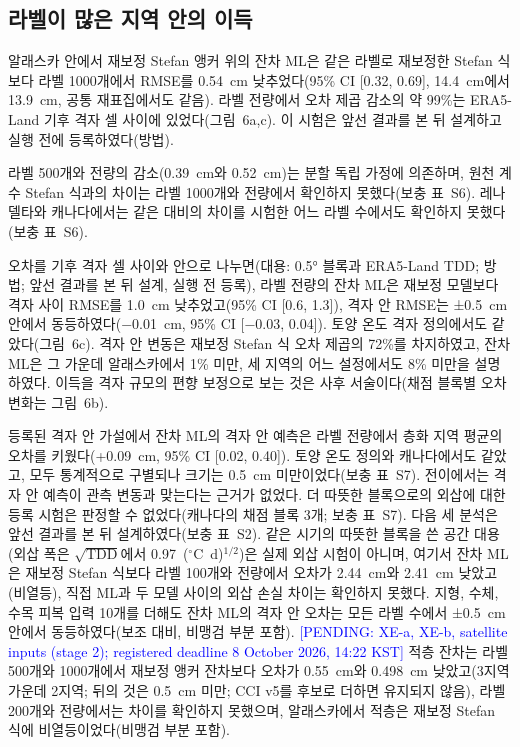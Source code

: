 
\subsection{라벨이 많은 지역 안의 이득}
\label{sec:results-label-rich}

알래스카 안에서 재보정 Stefan 앵커 위의 잔차 ML은 같은 라벨로 재보정한 Stefan 식보다 라벨 1000개에서 RMSE를 0.54~cm 낮추었다(95\% CI [0.32, 0.69], 14.4~cm에서 13.9~cm, 공통 재표집에서도 같음). 라벨 전량에서 오차 제곱 감소의 약 99\%는 ERA5-Land 기후 격자 셀 사이에 있었다\cite{munozsabater2021_era5_land}(그림~6a,c).
이 시험은 앞선 결과를 본 뒤 설계하고 실행 전에 등록하였다(방법).

라벨 500개와 전량의 감소(0.39~cm와 0.52~cm)는 분할 독립 가정에 의존하며, 원천 계수 Stefan 식과의 차이는 라벨 1000개와 전량에서 확인하지 못했다(보충 표~S6).
레나델타와 캐나다에서는 같은 대비의 차이를 시험한 어느 라벨 수에서도 확인하지 못했다(보충 표~S6).

오차를 기후 격자 셀 사이와 안으로 나누면(대용: 0.5° 블록과 ERA5-Land TDD; 방법; 앞선 결과를 본 뒤 설계, 실행 전 등록), 라벨 전량의 잔차 ML은 재보정 모델보다 격자 사이 RMSE를 1.0~cm 낮추었고(95\% CI [0.6, 1.3]), 격자 안 RMSE는 ±0.5~cm 안에서 동등하였다(−0.01~cm, 95\% CI [−0.03, 0.04]). 토양 온도 격자 정의에서도 같았다(그림~6c).
격자 안 변동은 재보정 Stefan 식 오차 제곱의 72\%를 차지하였고, 잔차 ML은 그 가운데 알래스카에서 1\% 미만, 세 지역의 어느 설정에서도 8\% 미만을 설명하였다.
이득을 격자 규모의 편향 보정으로 보는 것은 사후 서술이다(채점 블록별 오차 변화는 그림~6b).

등록된 격자 안 가설에서 잔차 ML의 격자 안 예측은 라벨 전량에서 층화 지역 평균의 오차를 키웠다(+0.09~cm, 95\% CI [0.02, 0.40]). 토양 온도 정의와 캐나다에서도 같았고, 모두 통계적으로 구별되나 크기는 0.5~cm 미만이었다(보충 표~S7).
전이에서는 격자 안 예측이 관측 변동과 맞는다는 근거가 없었다.
더 따뜻한 블록으로의 외삽에 대한 등록 시험은 판정할 수 없었다(캐나다의 채점 블록 3개; 보충 표~S7).
다음 세 분석은 앞선 결과를 본 뒤 설계하였다(보충 표~S2).
같은 시기의 따뜻한 블록을 쓴 공간 대용(외삽 폭은 $\sqrt{\mathrm{TDD}}$에서 0.97~($^{\circ}$C~d)$^{1/2}$)은 실제 외삽 시험이 아니며, 여기서 잔차 ML은 재보정 Stefan 식보다 라벨 100개와 전량에서 오차가 2.44~cm와 2.41~cm 낮았고(비열등), 직접 ML과 두 모델 사이의 외삽 손실 차이는 확인하지 못했다.
지형, 수체, 수목 피복 입력 10개를 더해도 잔차 ML의 격자 안 오차는 모든 라벨 수에서 ±0.5~cm 안에서 동등하였다(보조 대비, 비맹검 부분 포함). \textcolor{blue}{[PENDING: XE-a, XE-b, satellite inputs (stage 2); registered deadline 8 October 2026, 14:22 KST]}
적층 잔차는 라벨 500개와 1000개에서 재보정 앵커 잔차보다 오차가 0.55~cm와 0.498~cm 낮았고(3지역 가운데 2지역; 뒤의 것은 0.5~cm 미만; CCI v5를 후보로 더하면 유지되지 않음), 라벨 200개와 전량에서는 차이를 확인하지 못했으며, 알래스카에서 적층은 재보정 Stefan 식에 비열등이었다(비맹검 부분 포함).

